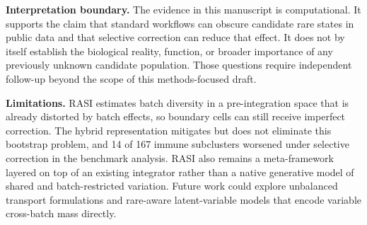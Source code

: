 \documentclass[10pt]{article}
\begin{document}
\textbf{Interpretation boundary.} The evidence in this manuscript is computational. It supports the claim that standard workflows can obscure candidate rare states in public data and that selective correction can reduce that effect. It does not by itself establish the biological reality, function, or broader importance of any previously unknown candidate population. Those questions require independent follow-up beyond the scope of this methods-focused draft.

\textbf{Limitations.} RASI estimates batch diversity in a pre-integration space that is already distorted by batch effects, so boundary cells can still receive imperfect correction. The hybrid representation mitigates but does not eliminate this bootstrap problem, and 14 of 167 immune subclusters worsened under selective correction in the benchmark analysis. RASI also remains a meta-framework layered on top of an existing integrator rather than a native generative model of shared and batch-restricted variation. Future work could explore unbalanced transport formulations and rare-aware latent-variable models that encode variable cross-batch mass directly.\cite{chizat2018}
\end{document}
